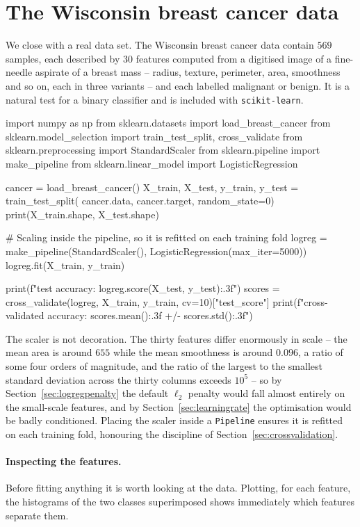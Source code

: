 \section{The Wisconsin breast cancer data}
\label{sec:wisconsin}

We close with a real data set.  The Wisconsin breast cancer data contain $569$
samples, each described by $30$ features computed from a digitised image of a
fine-needle aspirate of a breast mass -- radius, texture, perimeter, area,
smoothness and so on, each in three variants -- and each labelled malignant or
benign.  It is a natural test for a binary classifier and is included with
\texttt{scikit-learn}.

\begin{Python}{}
import numpy as np
from sklearn.datasets import load_breast_cancer
from sklearn.model_selection import train_test_split, cross_validate
from sklearn.preprocessing import StandardScaler
from sklearn.pipeline import make_pipeline
from sklearn.linear_model import LogisticRegression

cancer = load_breast_cancer()
X_train, X_test, y_train, y_test = train_test_split(
    cancer.data, cancer.target, random_state=0)
print(X_train.shape, X_test.shape)

# Scaling inside the pipeline, so it is refitted on each training fold
logreg = make_pipeline(StandardScaler(), LogisticRegression(max_iter=5000))
logreg.fit(X_train, y_train)

print(f"test accuracy: {logreg.score(X_test, y_test):.3f}")
scores = cross_validate(logreg, X_train, y_train, cv=10)["test_score"]
print(f"cross-validated accuracy: {scores.mean():.3f} +/- {scores.std():.3f}")
\end{Python}

The scaler is not decoration.  The thirty features differ enormously in
scale -- the mean area is around $655$ while the mean smoothness is around
$0.096$, a ratio of some four orders of magnitude, and the ratio of the
largest to the smallest standard deviation across the thirty columns exceeds
$10^{5}$ -- so by Section~\ref{sec:logregpenalty} the default $\ell_2$
penalty would fall almost entirely on the small-scale features, and by
Section~\ref{sec:learningrate} the optimisation would be badly conditioned.
Placing the scaler inside a \texttt{Pipeline} ensures it is refitted on each
training fold, honouring the discipline of
Section~\ref{sec:crossvalidation}.

\paragraph{Inspecting the features.}
Before fitting anything it is worth looking at the data.  Plotting, for each
feature, the histograms of the two classes superimposed shows immediately
which features separate them.

